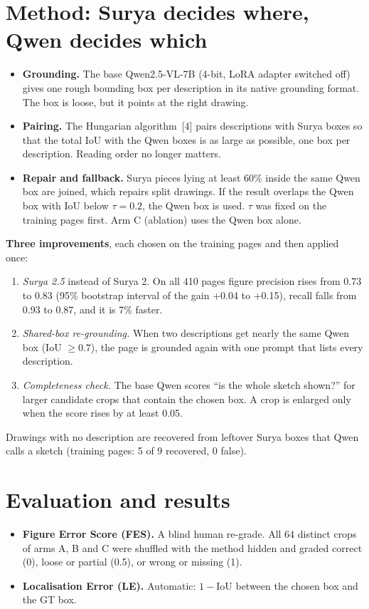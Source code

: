 \documentclass[11pt,a4paper]{article}
\begin{document}
\section{Method: Surya decides where, Qwen decides which}
\begin{itemize}
\item \textbf{Grounding.} The base Qwen2.5-VL-7B (4-bit, LoRA adapter switched off) gives one rough bounding box
per description in its native grounding format. The box is loose, but it points at the right drawing.
\item \textbf{Pairing.} The Hungarian algorithm~[4] pairs descriptions with Surya boxes so that the total IoU
with the Qwen boxes is as large as possible, one box per description. Reading order no longer matters.
\item \textbf{Repair and fallback.} Surya pieces lying at least 60\% inside the same Qwen box are joined, which
repairs split drawings. If the result overlaps the Qwen box with IoU below $\tau=0.2$, the Qwen box is used.
$\tau$ was fixed on the training pages first. Arm C (ablation) uses the Qwen box alone.
\end{itemize}
\textbf{Three improvements}, each chosen on the training pages and then applied once:
\begin{enumerate}
\item \emph{Surya 2.5} instead of Surya 2. On all 410 pages figure precision rises from 0.73 to 0.83 (95\%
bootstrap interval of the gain +0.04 to +0.15), recall falls from 0.93 to 0.87, and it is 7\% faster.
\item \emph{Shared-box re-grounding.} When two descriptions get nearly the same Qwen box (IoU $\ge 0.7$), the
page is grounded again with one prompt that lists every description.
\item \emph{Completeness check.} The base Qwen scores ``is the whole sketch shown?'' for larger candidate crops
that contain the chosen box. A crop is enlarged only when the score rises by at least 0.05.
\end{enumerate}
Drawings with no description are recovered from leftover Surya boxes that Qwen calls a sketch (training pages:
5 of 9 recovered, 0 false).

\section{Evaluation and results}
\begin{itemize}
\item \textbf{Figure Error Score (FES).} A blind human re-grade. All 64 distinct crops of arms A, B and C were
shuffled with the method hidden and graded correct (0), loose or partial (0.5), or wrong or missing (1).
\item \textbf{Localisation Error (LE).} Automatic: $1-\mathrm{IoU}$ between the chosen box and the GT box.
\end{itemize}
\end{document}
